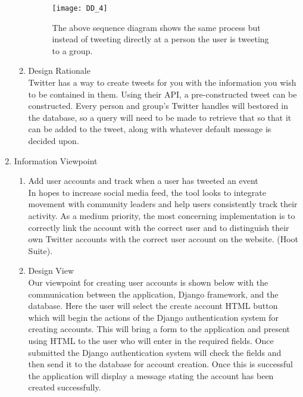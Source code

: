\documentclass[draftclsnofoot,10pt,onecolumn]{IEEEtran} %
\begin{document}
\begin{enumerate}
\begin{enumerate}
				\begin{figure}[H]
  					\begin{center}
						\texttt{[image: DD\_4]}
						\captionsetup{width=.4\linewidth}
						\centering
  						\caption{The above sequence diagram shows the same process but instead of tweeting directly 
  						at a person the user is tweeting to a group.}
  					\end{center}
				\end{figure}
				
				\item Design Rationale \\
				Twitter has a way to create tweets for you with the information you wish to be contained in them. Using
				their API, a pre-constructed tweet can be constructed. Every person and group's Twitter handles will bestored in the 						database, so a query will need to be made to retrieve that so that it can be added to the tweet,
				along with whatever default message is decided upon. \\
			\end{enumerate}
			
		\item Information Viewpoint \\
			\begin{enumerate}
				\item Add user accounts and track when a user has tweeted an event \\
				In hopes to increase social media feed, the tool looks to integrate movement with community leaders and
				help users consistently track their activity. As a medium priority, the most concerning implementation is to
				correctly link the account with the correct user and to distinguish their own Twitter accounts with the
				correct user account on the website. (Hoot Suite). \\
				
				\item Design View \\ %
				Our viewpoint for creating user accounts is shown below with the communication between the application,
				Django framework, and the database. Here the user will select the create account HTML button which will
				begin the actions of the Django authentication system for creating accounts. This will bring a form to the
				application and present using HTML to the user who will enter in the required fields. Once submitted the
				Django authentication system will check the fields and then send it to the database for account creation.
				Once this is successful the application will display a message stating the account has been created
				successfully. \\
				

\end{enumerate}
\end{enumerate}
\end{document}
